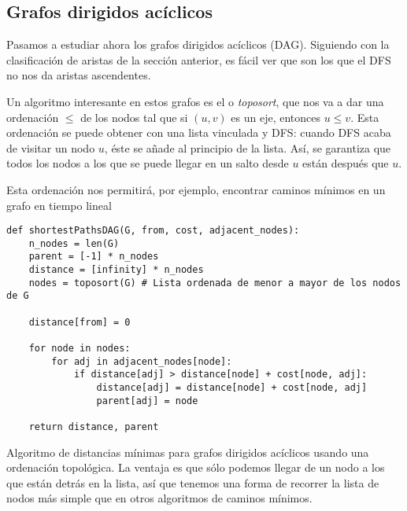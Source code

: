\documentclass[palatino, nochap]{apuntes}
\begin{document}
\subsection{Grafos dirigidos acíclicos}

Pasamos a estudiar ahora los grafos dirigidos acíclicos (DAG). Siguiendo con la clasificación de aristas de la sección anterior, es fácil ver que son los que el DFS no nos da aristas ascendentes.

Un algoritmo interesante en estos grafos es el  o \textit{toposort}, que nos va a dar una ordenación $≤$ de los nodos tal que si $(u,v)$ es un eje, entonces $u ≤ v$. Esta ordenación se puede obtener con una lista vinculada y DFS: cuando DFS acaba de visitar un nodo $u$, éste se añade al principio de la lista. Así, se garantiza que todos los nodos a los que se puede llegar en un salto desde $u$ están después que $u$.

Esta ordenación nos permitirá, por ejemplo, encontrar caminos mínimos en un grafo en tiempo lineal



\begin{listing}[hbtp]
\begin{verbatim}
def shortestPathsDAG(G, from, cost, adjacent_nodes):
	n_nodes = len(G)
	parent = [-1] * n_nodes
	distance = [infinity] * n_nodes
	nodes = toposort(G) # Lista ordenada de menor a mayor de los nodos de G

	distance[from] = 0

	for node in nodes:
		for adj in adjacent_nodes[node]:
			if distance[adj] > distance[node] + cost[node, adj]:
				distance[adj] = distance[node] + cost[node, adj]
				parent[adj] = node

	return distance, parent
\end{verbatim}
\caption{Algoritmo de distancias mínimas para grafos dirigidos acíclicos usando una ordenación topológica. La ventaja es que sólo podemos llegar de un nodo a los que están detrás en la lista, así que tenemos una forma de recorrer la lista de nodos más simple que en otros algoritmos de caminos mínimos.}
\label{lst:Prim}
\end{listing}

\appendix

\printindex
\end{document}
